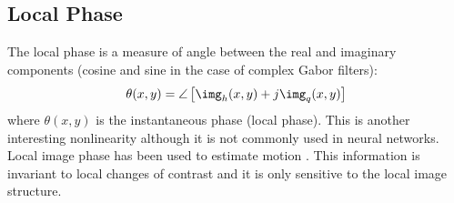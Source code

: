 %
%

\subsection{Local Phase}

The local phase is a measure of angle between the real and imaginary components (cosine and sine in the case of complex Gabor filters): 
\begin{equation}
\theta(x,y) = \angle \left[ \img_h(x,y) + j \img_q(x,y) \right]
\end{equation}
where $\theta (x,y)$ is the instantaneous phase (local phase). This is another interesting nonlinearity although it is not commonly used in neural networks. Local image phase has been used to estimate motion \cite{Fleet89}. This information is invariant to local changes of contrast and it is only sensitive to the local image structure. 

